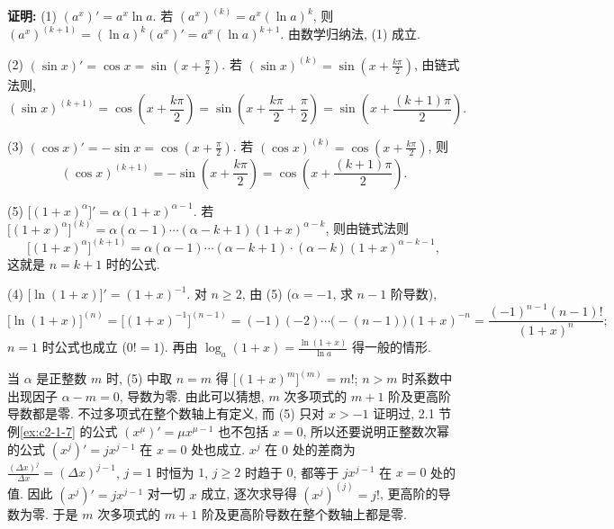 \documentclass[UTF8,openany]{ctexbook}
\theoremstyle{chinesetextbook}
\newenvironment{cnproof}{\par\indent\textbf{证明:} \ignorespaces}{\par}
\begin{document}
\begin{cnproof}
(1) $(a^x)'=a^x\ln a$. 若 $(a^x)^{(k)}=a^x(\ln a)^k$, 则 $(a^x)^{(k+1)}=(\ln a)^k(a^x)'=a^x(\ln a)^{k+1}$. 由数学归纳法, (1) 成立.

(2) $\displaystyle(\sin x)'=\cos x=\sin\left(x+\frac\pi2\right)$. 若 $\displaystyle(\sin x)^{(k)}=\sin\left(x+\frac{k\pi}2\right)$, 由链式法则,
\[
(\sin x)^{(k+1)}=\cos\left(x+\frac{k\pi}2\right)=\sin\left(x+\frac{k\pi}2+\frac\pi2\right)=\sin\left(x+\frac{(k+1)\pi}2\right).
\]

(3) $\displaystyle(\cos x)'=-\sin x=\cos\left(x+\frac\pi2\right)$. 若 $\displaystyle(\cos x)^{(k)}=\cos\left(x+\frac{k\pi}2\right)$, 则
\[
(\cos x)^{(k+1)}=-\sin\left(x+\frac{k\pi}2\right)=\cos\left(x+\frac{(k+1)\pi}2\right).
\]

(5) $\bigl[(1+x)^\alpha\bigr]'=\alpha(1+x)^{\alpha-1}$. 若 $\bigl[(1+x)^\alpha\bigr]^{(k)}=\alpha(\alpha-1)\cdots(\alpha-k+1)(1+x)^{\alpha-k}$, 则由链式法则
\[
\bigl[(1+x)^\alpha\bigr]^{(k+1)}=\alpha(\alpha-1)\cdots(\alpha-k+1)\cdot(\alpha-k)(1+x)^{\alpha-k-1},
\]
这就是 $n=k+1$ 时的公式.

(4) $\displaystyle\bigl[\ln(1+x)\bigr]'=(1+x)^{-1}$. 对 $n\ge2$, 由 (5) ($\alpha=-1$, 求 $n-1$ 阶导数),
\[
\bigl[\ln(1+x)\bigr]^{(n)}=\bigl[(1+x)^{-1}\bigr]^{(n-1)}=(-1)(-2)\cdots\bigl(-(n-1)\bigr)(1+x)^{-n}=\frac{(-1)^{n-1}(n-1)!}{(1+x)^n};
\]
$n=1$ 时公式也成立 ($0!=1$). 再由 $\displaystyle\log_a(1+x)=\frac{\ln(1+x)}{\ln a}$ 得一般的情形.
\end{cnproof}
当 $\alpha$ 是正整数 $m$ 时, (5) 中取 $n=m$ 得 $\bigl[(1+x)^m\bigr]^{(m)}=m!$; $n>m$ 时系数中出现因子 $\alpha-m=0$, 导数为零. 由此可以猜想, $m$ 次多项式的 $m+1$ 阶及更高阶导数都是零. 不过多项式在整个数轴上有定义, 而 (5) 只对 $x>-1$ 证明过, 2.1 节例\ref{ex:c2-1-7} 的公式 $(x^\mu)'=\mu x^{\mu-1}$ 也不包括 $x=0$, 所以还要说明正整数次幂的公式 $(x^j)'=jx^{j-1}$ 在 $x=0$ 处也成立. $x^j$ 在 $0$ 处的差商为 $\displaystyle\frac{(\Delta x)^j}{\Delta x}=(\Delta x)^{j-1}$, $j=1$ 时恒为 $1$, $j\ge2$ 时趋于 $0$, 都等于 $jx^{j-1}$ 在 $x=0$ 处的值. 因此 $(x^j)'=jx^{j-1}$ 对一切 $x$ 成立, 逐次求导得 $(x^j)^{(j)}=j!$, 更高阶的导数为零. 于是 $m$ 次多项式的 $m+1$ 阶及更高阶导数在整个数轴上都是零.
\end{document}
